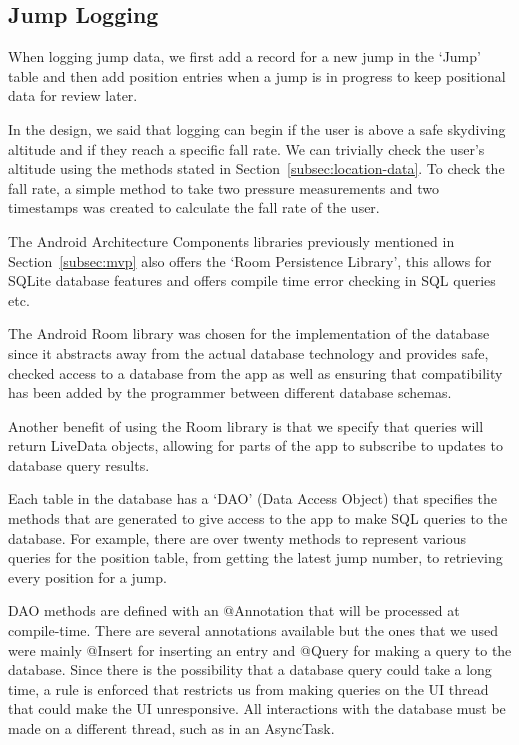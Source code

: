 \subsection{Jump Logging}
When logging jump data, we first add a record for a new jump in the `Jump' table and then add position entries when a jump is in progress to keep positional data for review later.

In the design, we said that logging can begin if the user is above a safe skydiving altitude and if they reach a specific fall rate. We can trivially check the user's altitude using the methods stated in Section~\ref{subsec:location-data}. To check the fall rate, a simple method to take two pressure measurements and two timestamps was created to calculate the fall rate of the user.

The Android Architecture Components libraries previously mentioned in Section~\ref{subsec:mvp} also offers the `Room Persistence Library', this allows for SQLite database features and offers compile time error checking in SQL queries etc.

The Android Room library was chosen for the implementation of the database since it abstracts away from the actual database technology and provides safe, checked access to a database from the app as well as ensuring that compatibility has been added by the programmer between different database schemas.

Another benefit of using the Room library is that we specify that queries will return LiveData objects, allowing for parts of the app to subscribe to updates to database query results.

Each table in the database has a `DAO' (Data Access Object) that specifies the methods that are generated to give access to the app to make SQL queries to the database. For example, there are over twenty methods to represent various queries for the position table, from getting the latest jump number, to retrieving every position for a jump.

DAO methods are defined with an @Annotation that will be processed at compile-time. There are several annotations available but the ones that we used were mainly @Insert for inserting an entry and @Query for making a query to the database. Since there is the possibility that a database query could take a long time, a rule is enforced that restricts us from making queries on the UI thread that could make the UI unresponsive. All interactions with the database must be made on a different thread, such as in an AsyncTask.

